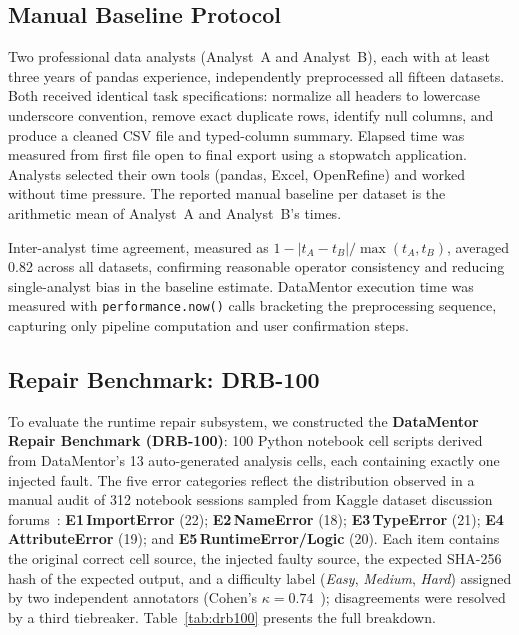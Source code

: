 \documentclass[conference]{IEEEtran}
\begin{document}
\subsection{Manual Baseline Protocol}

Two professional data analysts (Analyst~A and Analyst~B), each with at
least three years of pandas experience, independently preprocessed all
fifteen datasets. Both received identical task specifications: normalize
all headers to lowercase underscore convention, remove exact duplicate
rows, identify null columns, and produce a cleaned CSV file and
typed-column summary. Elapsed time was measured from first file open to
final export using a stopwatch application. Analysts selected their own
tools (pandas, Excel, OpenRefine) and worked without time pressure. The
reported manual baseline per dataset is the arithmetic mean of
Analyst~A and Analyst~B's times.

Inter-analyst time agreement, measured as
$1-|t_A-t_B|/\max(t_A,t_B)$, averaged 0.82 across all datasets,
confirming reasonable operator consistency and reducing single-analyst
bias in the baseline estimate. DataMentor execution time was measured
with \texttt{performance.now()} calls bracketing the preprocessing
sequence, capturing only pipeline computation and user confirmation steps.

\subsection{Repair Benchmark: DRB-100}

To evaluate the runtime repair subsystem, we constructed the
\textbf{DataMentor Repair Benchmark (DRB-100)}: 100 Python notebook
cell scripts derived from DataMentor's 13 auto-generated analysis
cells, each containing exactly one injected fault. The five error
categories reflect the distribution observed in a manual audit of
312 notebook sessions sampled from Kaggle dataset discussion
forums~\cite{kaggle2023}: \textbf{E1\,ImportError} (22);
\textbf{E2\,NameError} (18); \textbf{E3\,TypeError} (21);
\textbf{E4\,AttributeError} (19); and \textbf{E5\,RuntimeError/Logic}
(20). Each item contains the original correct cell source, the injected
faulty source, the expected SHA-256 hash of the expected output, and a
difficulty label (\emph{Easy}, \emph{Medium}, \emph{Hard}) assigned by
two independent annotators (Cohen's $\kappa=0.74$~\cite{landis1977});
disagreements were resolved by a third tiebreaker.
Table~\ref{tab:drb100} presents the full breakdown.
\end{document}
